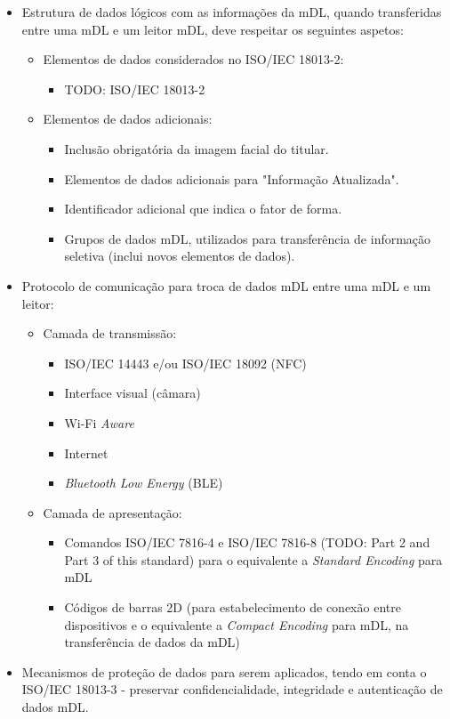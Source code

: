 \begin{itemize}
	\item Estrutura de dados lógicos com as informações da mDL, quando transferidas entre uma mDL e um leitor mDL, deve respeitar os seguintes aspetos:
	\begin{itemize}
		\item Elementos de dados considerados no ISO/IEC 18013-2:
		\begin{itemize}
			\item TODO: ISO/IEC 18013-2
		\end{itemize}

		\item Elementos de dados adicionais:
		\begin{itemize}
			\item Inclusão obrigatória da imagem facial do titular.
			\item Elementos de dados adicionais para "Informação Atualizada".
			\item Identificador adicional que indica o fator de forma.
			\item Grupos de dados mDL, utilizados para transferência de informação seletiva (inclui novos elementos de dados).
		\end{itemize}
	\end{itemize}

	\item Protocolo de comunicação para troca de dados mDL entre uma mDL e um leitor:
	\begin{itemize}
		\item Camada de transmissão:
		\begin{itemize}
			\item ISO/IEC 14443 e/ou ISO/IEC 18092 (NFC)
			\item Interface visual (câmara)
			\item Wi-Fi \textit{Aware}
			\item Internet
			\item \textit{Bluetooth Low Energy} (BLE)
		\end{itemize}
		\item Camada de apresentação:
		\begin{itemize}
			\item Comandos ISO/IEC 7816-4 e ISO/IEC 7816-8 (TODO: Part 2 and Part 3 of this standard) para o equivalente a \textit{Standard Encoding} para mDL
			\item Códigos de barras 2D (para estabelecimento de conexão entre dispositivos e o equivalente a \textit{Compact Encoding} para mDL, na transferência de dados da mDL)
		\end{itemize}
	\end{itemize}

	\item Mecanismos de proteção de dados para serem aplicados, tendo em conta o ISO/IEC 18013-3 - preservar confidencialidade, integridade e autenticação de dados mDL.
\end{itemize}

